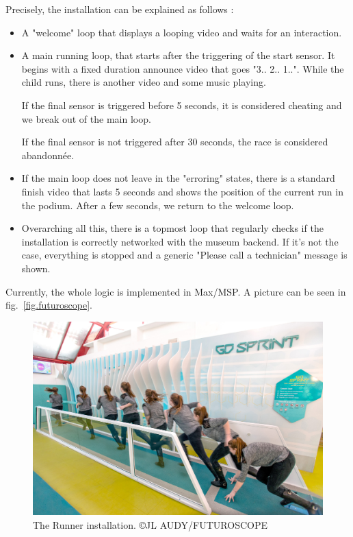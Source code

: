 \documentclass{sigchi}
\begin{document}
Precisely, the installation can be explained as follows : 
\begin{itemize}
    \item A "welcome" loop that displays a looping video and waits for an interaction.
    \item A main running loop, that starts after the triggering of the start sensor. It begins with a fixed duration announce video that goes "3.. 2.. 1..". While the child runs, there is another video and some music playing. 
    
    If the final sensor is triggered before 5 seconds, it is considered cheating and we break out of the main loop.
    
    If the final sensor is not triggered after 30 seconds, the race is considered abandonnée. 
    
    \item If the main loop does not leave in the "erroring" states, there is a standard finish video that lasts 5 seconds and shows the position of the current run in the podium. After a few seconds, we return to the welcome loop.
    
    \item Overarching all this, there is a topmost loop that regularly checks if the installation is correctly networked with the museum backend. If it's not the case, everything is stopped and a generic "Please call a technician" message is shown.
\end{itemize}

Currently, the whole logic is implemented in Max/MSP. A picture can be seen in fig.~\ref{fig.futuroscope}.

\begin{figure}
    \centering
    \includegraphics[scale=0.6]{images/futuroscope.jpg}
    \caption{The Runner installation. \tiny{©JL AUDY/FUTUROSCOPE}}
\end{figure}
\end{document}
